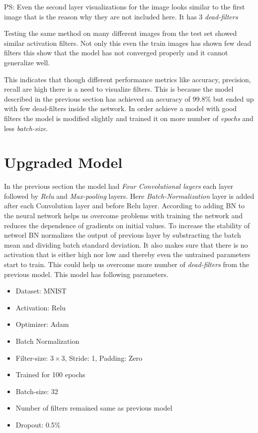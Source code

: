  \noindent PS: Even the second layer visualizations for the image looks similar to the first image that is the reason why they are not included here. It has 3 \textit{dead-filters}

\noindent Testing the same method on many different images from the test set showed similar activation filters. Not only this even the train images has shown few dead filters this show that the model has not converged properly and it cannot generalize well.

This indicates that though different performance metrics like accuracy, precision, recall are high there is a need to visualize filters. This is because the model described in the previous section has achieved an accuracy of 99.8\% but ended up with few dead-filters inside the network. In order achieve a model with good filters the model is modified slightly and trained it on more number of \textit{epochs} and less \textit{batch-size}.
\section{Upgraded Model}
In the previous section the model had \textit{Four Convolutional layers} each layer followed by \textit{Relu} and \textit{Max-pooling} layers. Here \textit{Batch-Normalization} layer is added after each Convolution layer and before Relu layer. According to \cite{Sergey} adding BN to the neural network helps us overcome problems with training the network and reduces the dependence of gradients on initial values. To increase the stability of networl BN normalizes the output of previous layer by substracting the batch mean and dividing batch standard deviation. It also makes sure that there is no activation that is either high nor low and thereby even the untrained parameters start to train. This could help us overcome more number of \textit{dead-filters} from the previous model. This model has following parameters.
\begin{itemize}
\item Dataset: MNIST
    \item Activation: Relu
    \item Optimizer: Adam
    \item Batch Normalization
    \item Filter-size: $3 \times 3$, Stride: 1, Padding: Zero
    \item Trained for 100 epochs 
    \item Batch-size: 32
    \item Number of filters remained same as previous model
    \item Dropout: 0.5\%
\end{itemize}

